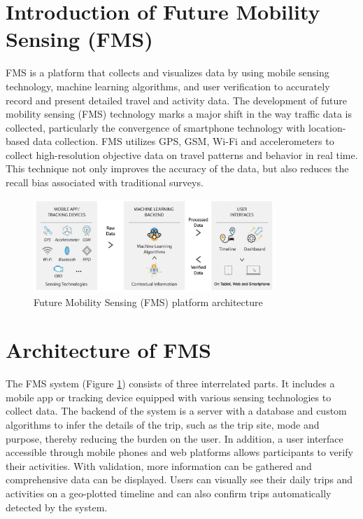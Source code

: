 \documentclass[12pt,two side]{report}
\begin{document}
\section{Introduction of Future Mobility Sensing (FMS)\cite{alho2022online}\cite{cottrill2013future}}
FMS is a platform that collects and visualizes data by using mobile sensing technology, machine learning algorithms, and user verification to accurately record and present detailed travel and activity data. The development of future mobility sensing (FMS) technology marks a major shift in the way traffic data is collected, particularly the convergence of smartphone technology with location-based data collection. FMS utilizes GPS, GSM, Wi-Fi and accelerometers to collect high-resolution objective data on travel patterns and behavior in real time. This technique not only improves the accuracy of the data, but also reduces the recall bias associated with traditional surveys.
\begin{figure}
\centering
\includegraphics[width=9.1cm]{background_report/figures/FMS.png}
\caption{Future Mobility Sensing (FMS) platform architecture\cite{cottrill2013future}}
\label{figure:1}
\end{figure}
\section{Architecture of FMS}
The FMS system (Figure \ref{figure:1}) consists of three interrelated parts. It includes a mobile app or tracking device equipped with various sensing technologies to collect data\cite{cottrill2013future}. The backend of the system is a server with a database and custom algorithms to infer the details of the trip, such as the trip site, mode and purpose, thereby reducing the burden on the user\cite{cottrill2013future}. In addition, a user interface accessible through mobile phones and web platforms allows participants to verify their activities. With validation, more information can be gathered and comprehensive data can be displayed\cite{cottrill2013future}. Users can visually see their daily trips and activities on a geo-plotted timeline and can also confirm trips automatically detected by the system.
\end{document}
